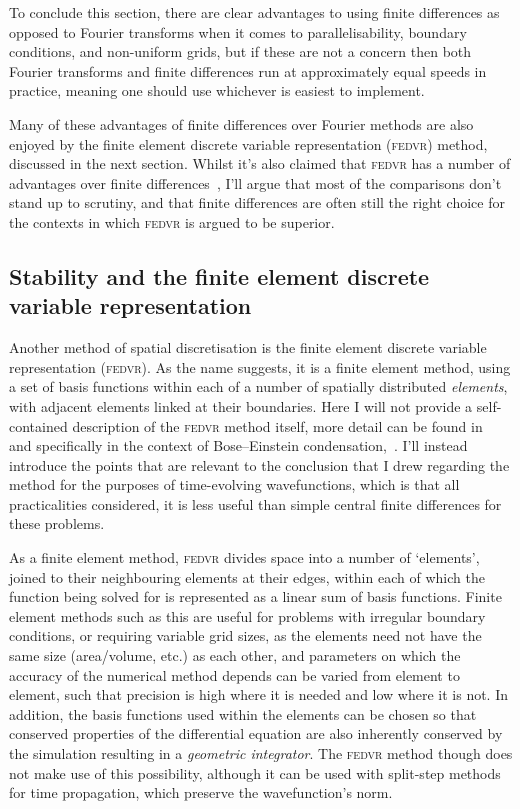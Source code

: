 To conclude this section, there are clear advantages to using finite differences as opposed to Fourier transforms when it comes to parallelisability, boundary conditions, and non-uniform grids, but if these are not a concern then both Fourier transforms and finite differences run at approximately equal speeds in practice, meaning one should use whichever is easiest to implement.

Many of these advantages of finite differences over Fourier methods are also enjoyed by the finite element discrete variable representation (\textsc{fedvr}) method, discussed in the next section. Whilst it's also claimed that \textsc{fedvr} has a number of advantages over finite differences~\cite{schneider_discrete_2005,schneider_parallel_2006}, I'll argue that most of the comparisons don't stand up to scrutiny, and that finite differences are often still the right choice for the contexts in which \textsc{fedvr} is argued to be superior.

\subsection{Stability and the finite element discrete variable representation}\label{sec:fedvr}

Another method of spatial discretisation is the finite element discrete variable representation (\textsc{fedvr}). As the name suggests, it is a finite element method, using a set of basis functions within each of a number of spatially distributed \emph{elements}, with adjacent elements linked at their boundaries. Here I will not provide a self-contained description of the \textsc{fedvr} method itself, more detail can be found in~\cite[p.~285]{tannor_introduction_2007} and specifically in the context of Bose--Einstein condensation,~\cite{schneider_discrete_2005,schneider_parallel_2006}. I'll instead introduce the points that are relevant to the conclusion that I drew regarding the method for the purposes of time-evolving wavefunctions, which is that all practicalities considered, it is less useful than simple central finite differences for these problems.

As a finite element method, \textsc{fedvr} divides space into a number of `elements', joined to their neighbouring elements at their edges, within each of which the function being solved for is represented as a linear sum of basis functions. Finite element methods such as this are useful for problems with irregular boundary conditions, or requiring variable grid sizes, as the elements need not have the same size (area/volume, etc.) as each other, and parameters on which the accuracy of the numerical method depends can be varied from element to element, such that precision is high where it is needed and low where it is not. In addition, the basis functions used within the elements can be chosen so that conserved properties of the differential equation are also inherently conserved by the simulation resulting in a \emph{geometric integrator}. The \textsc{fedvr} method though does not make use of this possibility, although it can be used with split-step methods for time propagation, which preserve the wavefunction's norm.

